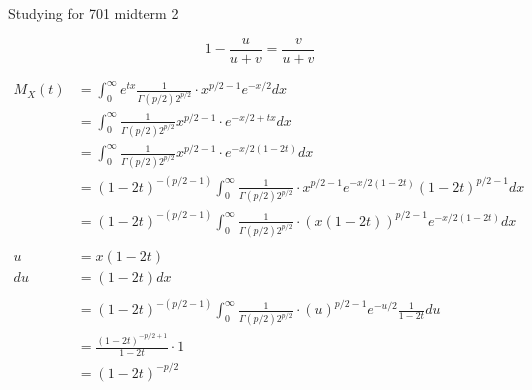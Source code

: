 \documentclass[]{article}
\begin{document}
Studying for 701 midterm 2

$$
1 - \frac{ u }{ u+v } = \frac{ v }{ u+v }
$$



\begin{align*}
	M_X(t) & = \int_{0} ^{\infty} e^{t x} \frac{ 1 }{ \Gamma(p/2) 2^{p/2}} \cdot  x^{p/2-1}  e^{-x/2} dx\\
		& = \int_{0} ^{\infty} \frac{ 1 }{ \Gamma(p/2) 2^{p/2}}  x^{p/2-1} \cdot e^{-x/2 + tx} dx\\
		& = \int_{0} ^{\infty} \frac{ 1 }{ \Gamma(p/2) 2^{p/2}}  x^{p/2-1} \cdot e^{-x/2 (1-2t)} dx\\
		& = (1-2t)^{-(p/2-1)}  \int_{0} ^{\infty} \frac{ 1 }{ \Gamma(p/2) 2^{p/2}} \cdot x^{p/2-1}  e^{-x/2 (1-2t)}  (1-2t)^{p/2-1} dx\\
		& = (1-2t)^{-(p/2-1)}  \int_{0} ^{\infty} \frac{ 1 }{ \Gamma(p/2) 2^{p/2}} \cdot (x (1-2t))^{p/2-1}  e^{-x/2 (1-2t)}  dx\\ \\
		u & = x(1-2t) \\
		du & = (1-2t) dx \\ \\
		& = (1-2t)^{-(p/2-1)}  \int_{0} ^{\infty} \frac{ 1 }{ \Gamma(p/2) 2^{p/2}} \cdot (u)^{p/2-1}  e^{-u/2 } \frac{ 1 }{ 1-2t }  du\\ 
		& = \frac{ (1-2t)^{-p/2 + 1} }{ 1-2t } \cdot 1 \\
		& = (1-2t)^{-p/2}
\end{align*}
\end{document}
